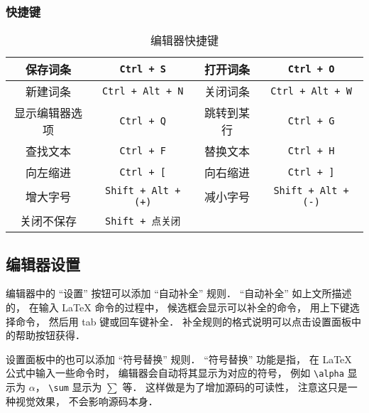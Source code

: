 \subsubsection{快捷键}

\begin{table}[ht]
\centering
\caption{编辑器快捷键}\label{editor_tab1}
\begin{tabular}{|c|c|c|c|}
\hline
保存词条 & \verb|Ctrl + S| & 打开词条 & \verb|Ctrl + O| \\
\hline
新建词条 & \verb|Ctrl + Alt + N| & 关闭词条 & \verb|Ctrl + Alt + W| \\
\hline
显示编辑器选项 & \verb|Ctrl + Q| & 跳转到某行 & \verb|Ctrl + G| \\
\hline
查找文本 & \verb|Ctrl + F| & 替换文本 & \verb|Ctrl + H| \\
\hline
向左缩进 & \verb|Ctrl + [| & 向右缩进 & \verb|Ctrl + ]| \\
\hline
增大字号 & \verb|Shift + Alt + (+)| & 减小字号 & \verb|Shift + Alt + (-)| \\
\hline
关闭不保存 & \verb|Shift + 点关闭| &  &  \\
\hline
\end{tabular}
\end{table}

\subsection{编辑器设置}
编辑器中的 “设置” 按钮可以添加 “自动补全” 规则． “自动补全” 如上文所描述的， 在输入 LaTeX 命令的过程中， 候选框会显示可以补全的命令， 用上下键选择命令， 然后用 tab 键或回车键补全． 补全规则的格式说明可以点击设置面板中的帮助按钮获得．

设置面板中的也可以添加 “符号替换” 规则． “符号替换” 功能是指， 在 LaTeX 公式中输入一些命令时， 编辑器会自动将其显示为对应的符号， 例如 \verb|\alpha| 显示为 $\alpha$， \verb|\sum| 显示为 $\sum$ 等． 这样做是为了增加源码的可读性， 注意这只是一种视觉效果， 不会影响源码本身．
